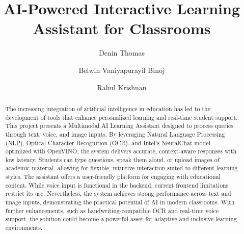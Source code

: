 \documentclass{josis}
\begin{document}


\title{AI-Powered Interactive Learning Assistant for Classrooms}

\author{Denin Thomas}
\author{Belwin Vaniyapurayil Binoj}
\author{Rahul Krishnan}
\date{}
\maketitle
\begin{abstract}
The increasing integration of artificial intelligence in education has led to the development of tools that enhance personalized learning and real-time student support. This project presents a Multimodal AI Learning Assistant designed to process queries through text, voice, and image inputs. By leveraging Natural Language Processing (NLP), Optical Character Recognition (OCR), and Intel's NeuralChat model optimized with OpenVINO, the system delivers accurate, context-aware responses with low latency. Students can type questions, speak them aloud, or upload images of academic material, allowing for flexible, intuitive interaction suited to different learning styles. The assistant offers a user-friendly platform for engaging with educational content. While voice input is functional in the backend, current frontend limitations restrict its use. Nevertheless, the system achieves strong performance across text and image inputs, demonstrating the practical potential of AI in modern classrooms. With further enhancements, such as handwriting-compatible OCR and real-time voice support, the solution could become a powerful asset for adaptive and inclusive learning environments.

\end{abstract}
\end{document}
